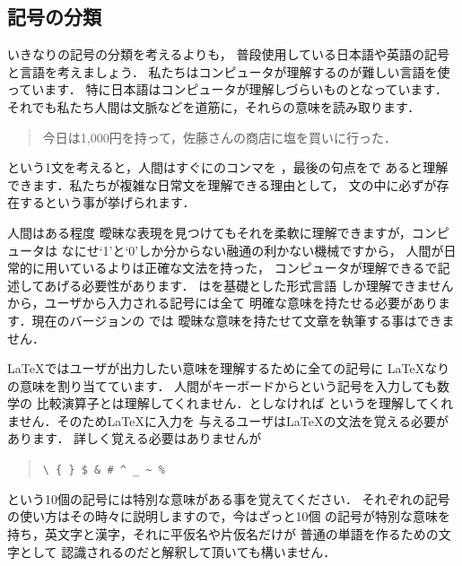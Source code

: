 \subsection{記号の分類}%
いきなり{\laTEX}の記号の分類を考えるよりも，
普段使用している日本語や英語の記号と言語を考えましょう．
私たちはコンピュータが理解するのが難しい言語を使っています．
特に日本語はコンピュータが理解しづらいものとなっています．
それでも私たち人間は文脈などを道筋に，それらの意味を読み取ります．
\begin{quotation}
 今日は1,000円を持って，佐藤さんの商店に塩を買いに行った．
\end{quotation}
という1文を考えると，人間はすぐにのコンマ\qu{\str,}を
，最後の句点をで
あると理解できます．私たちが複雑な日常文を理解できる理由として，
文の中に必ずが存在するという事が挙げられます．

人間はある程度
曖昧な表現を見つけてもそれを柔軟に理解できますが，コンピュータは
なにせ`1'と`0'しか分からない融通の利かない機械ですから，%
人間が日常的に用いているよりは正確な文法を持った，
コンピュータが理解できるで記述してあげる必要性があります．
\laTEX はを基礎とした形式言語
しか理解できませんから，ユーザから入力される記号には全て
明確な意味を持たせる必要があります．現在のバージョンの \laTEX では
曖昧な意味を持たせて文章を執筆する事はできません．

{\LaTeX}ではユーザが出力したい意味を理解するために全ての記号に
{\LaTeX}なりの意味を割り当てています．
人間がキーボードから\qu{\str<}という記号を入力しても数学の
比較演算子とは理解してくれません．\qu{\str$\str<\str$}としなければ
というを理解してくれません．そのため{\LaTeX}に入力を
与えるユーザは{\LaTeX}の文法を覚える必要があります．
詳しく覚える必要はありませんが
\begin{quote}
\verb|\ { } $ & # ^ _ ~ %|
\end{quote}
という10個の記号には特別な意味がある事を覚えてください．
それぞれの記号の使い方はその時々に説明しますので，今はざっと10個
の記号が特別な意味を持ち，英文字と漢字，それに平仮名や片仮名だけが
普通の単語を作るための文字として%
認識されるのだと解釈して頂いても構いません．

